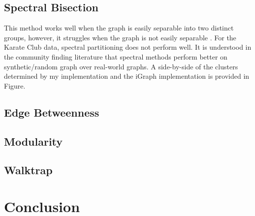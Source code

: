 \documentclass{article}
\begin{document}
    \subsection{Spectral Bisection}
    This method works well when the graph is easily separable into two distinct groups, however, it struggles when the graph is not easily separable \cite{Newman2004}. For the Karate Club data, spectral partitioning does not perform well. It is understood in the community finding literature that spectral methods perform better on synthetic/random graph over real-world graphs. A side-by-side of the clusters determined by my implementation and the iGraph implementation is provided in Figure.

    \subsection{Edge Betweenness}

    \subsection{Modularity}

    \subsection{Walktrap}




\section{Conclusion}

\newpage



\newpage
\end{document}
